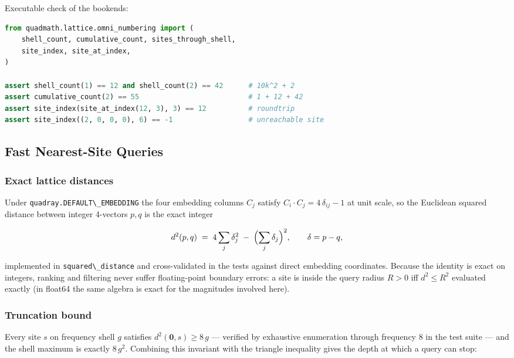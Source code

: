 \documentclass[
  10pt,
]{article}
\newcommand{\passthrough}[1]{#1}
\begin{document}
Executable check of the bookends:

\begin{lstlisting}[language=Python]
from quadmath.lattice.omni_numbering import (
    shell_count, cumulative_count, sites_through_shell,
    site_index, site_at_index,
)

assert shell_count(1) == 12 and shell_count(2) == 42      # 10k^2 + 2
assert cumulative_count(2) == 55                          # 1 + 12 + 42
assert site_index(site_at_index(12, 3), 3) == 12          # roundtrip
assert site_index((2, 0, 0, 0), 6) == -1                  # unreachable site
\end{lstlisting}

\subsection{Fast Nearest-Site Queries}\label{fast-nearest-site-queries}

\subsubsection{Exact lattice distances}\label{exact-lattice-distances}

Under \passthrough{\lstinline!quadray.DEFAULT\_EMBEDDING!} the four
embedding columns \(C_j\) satisfy \(C_i \cdot C_j = 4\,\delta_{ij} - 1\)
at unit scale, so the Euclidean squared distance between integer
4-vectors \(p, q\) is the exact integer

\begin{equation}\label{eq:lattice-distance-identity}
d^{2}(p, q) \;=\; 4 \sum_{j} \delta_j^{2} \;-\; \Bigl(\sum_{j} \delta_j\Bigr)^{2},
\qquad \delta = p - q,
\end{equation}

implemented in \passthrough{\lstinline!squared\_distance!} and
cross-validated in the tests against direct embedding coordinates.
Because the identity is exact on integers, ranking and filtering never
suffer floating-point boundary errors: a site is inside the query radius
\(R > 0\) iff \(d^{2} \le R^{2}\) evaluated exactly (in float64 the same
algebra is exact for the magnitudes involved here).

\subsubsection{Truncation bound}\label{truncation-bound}

Every site \(s\) on frequency shell \(g\) satisfies
\(d^{2}(\mathbf{0}, s) \ge 8\,g\) --- verified by exhaustive enumeration
through frequency 8 in the test suite --- and the shell maximum is
exactly \(8\,g^{2}\). Combining this invariant with the triangle
inequality gives the depth at which a query can stop:
\end{document}
